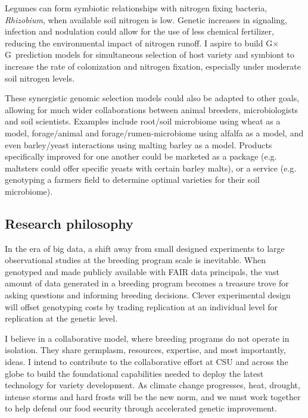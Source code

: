 \documentclass[11pt]{article}
\newcommand{\gxg}{G$\times$G}
\begin{document}
Legumes can form symbiotic relationships with nitrogen fixing bacteria, \emph{Rhizobium}, when available soil nitrogen is low. Genetic increases in signaling, infection and nodulation could allow for the use of less chemical fertilizer, reducing the environmental impact of nitrogen runoff. I aspire to build \gxg\ prediction models for simultaneous selection of host variety and symbiont to increase the rate of colonization and nitrogen fixation, especially under moderate soil nitrogen levels.



These synergistic genomic selection models could also be adapted to other goals, allowing for much wider collaborations between animal breeders, microbiologists and soil scientists. Examples include root/soil microbiome using wheat as a model, forage/animal and forage/rumen-microbiome using alfalfa as a model, and even barley/yeast interactions using malting barley as a model. Products specifically improved for one another could be marketed as a package (e.g. maltsters could offer specific yeasts with certain barley malts), or a service (e.g. genotyping a farmers field to determine optimal varieties for their soil microbiome). %


\subsection*{Research philosophy}

In the era of big data, a shift away from small designed experiments to large observational studies at the breeding program scale is inevitable. When genotyped and made publicly available with FAIR data principals, the vast amount of data generated in a breeding program becomes a treasure trove for asking questions and informing breeding decisions. Clever experimental design will offset genotyping costs by trading replication at an individual level for replication at the genetic level.

I believe in a collaborative model, where breeding programs do not operate in isolation. They share germplasm, resources, expertise, and most importantly, ideas. I intend to contribute to the collaborative effort at CSU and across the globe to build the foundational capabilities needed to deploy the latest technology for variety development. As climate change progresses, heat, drought, intense storms and hard frosts will be the new norm, and we must work together to help defend our food security through accelerated genetic improvement. 
\end{document}
